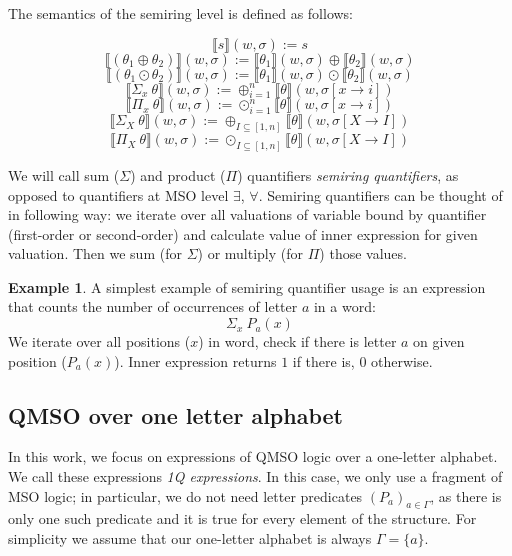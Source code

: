 \documentclass[12pt]{article}
\theoremstyle{definition}
\newtheorem{example}{Example}[section]
\begin{document}
The semantics of the semiring level is defined as follows:

$$\llbracket s\rrbracket(w, \sigma) := s$$
$$\llbracket(\theta_1 \oplus \theta_2)\rrbracket(w, \sigma) := \llbracket\theta_1\rrbracket(w, \sigma) \oplus \llbracket\theta_2\rrbracket(w, \sigma)$$
$$\llbracket(\theta_1 \odot \theta_2)\rrbracket(w, \sigma) := \llbracket\theta_1\rrbracket(w, \sigma) \odot \llbracket\theta_2\rrbracket(w, \sigma)$$
$$\llbracket \Sigma_x \ \theta \rrbracket(w, \sigma) := \oplus^n_{i=1}\llbracket \theta \rrbracket (w, \sigma[x \rightarrow i])$$
$$\llbracket \Pi_x \ \theta \rrbracket(w, \sigma) := \odot^n_{i=1}\llbracket \theta \rrbracket (w, \sigma[x \rightarrow i])$$
$$\llbracket \Sigma_X \ \theta \rrbracket(w, \sigma) := \oplus_{I \subseteq [1,n]}\llbracket \theta \rrbracket (w, \sigma[X \rightarrow I])$$
$$\llbracket \Pi_X \ \theta \rrbracket(w, \sigma) := \odot_{I \subseteq [1,n]}\llbracket \theta \rrbracket (w, \sigma[X \rightarrow I])$$

We will call sum ($\Sigma$) and product ($\Pi$) quantifiers \emph{semiring quantifiers}, as opposed to quantifiers at MSO level $\exists$, $\forall$. Semiring quantifiers can be thought of in following way: we iterate over all valuations of variable bound by quantifier (first-order or second-order) and calculate value of inner expression for given valuation. Then we sum (for $\Sigma$) or multiply (for $\Pi$) those values.

\begin{example}
    A simplest example of semiring quantifier usage is an expression that counts the number of occurrences of letter $a$ in a word:
    $$\Sigma_x \ P_a(x)$$
    We iterate over all positions ($x$) in word, check if there is letter $a$ on given position ($P_a(x)$). Inner expression returns $1$ if there is, $0$ otherwise. 
\end{example}

\subsection{QMSO over one letter alphabet}

In this work, we focus on expressions of QMSO logic over a one-letter alphabet. We call these expressions \emph{1Q expressions}. In this case, we only use a fragment of MSO logic; in particular, we do not need letter predicates $(P_a)_{a \in \Gamma}$, as there is only one such predicate and it is true for every element of the structure. For simplicity we assume that our one-letter alphabet is always $\Gamma = \{a\}$.
\end{document}
